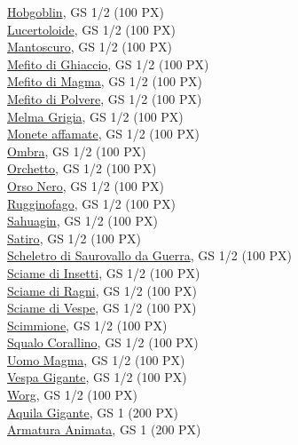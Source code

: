 \begin{multicols}{3}
{\hyperlink{Hobgoblin}{Hobgoblin}, GS 1/2 (100 PX)\\
\hyperlink{Lucertoloide}{Lucertoloide}, GS 1/2 (100 PX)\\
\hyperlink{Mantoscuro}{Mantoscuro}, GS 1/2 (100 PX)\\
\hyperlink{Mefito di Ghiaccio}{Mefito di Ghiaccio}, GS 1/2 (100 PX)\\
\hyperlink{Mefito di Magma}{Mefito di Magma}, GS 1/2 (100 PX)\\
\hyperlink{Mefito di Polvere}{Mefito di Polvere}, GS 1/2 (100 PX)\\
\hyperlink{Melma Grigia}{Melma Grigia}, GS 1/2 (100 PX)\\
\hyperlink{Monete affamate}{Monete affamate}, GS 1/2 (100 PX)\\
\hyperlink{Ombra}{Ombra}, GS 1/2 (100 PX)\\
\hyperlink{Orchetto}{Orchetto}, GS 1/2 (100 PX)\\
\hyperlink{Orso Nero}{Orso Nero}, GS 1/2 (100 PX)\\
\hyperlink{Rugginofago}{Rugginofago}, GS 1/2 (100 PX)\\
\hyperlink{Sahuagin}{Sahuagin}, GS 1/2 (100 PX)\\
\hyperlink{Satiro}{Satiro}, GS 1/2 (100 PX)\\
\hyperlink{Scheletro di Saurovallo da Guerra}{Scheletro di Saurovallo da Guerra}, GS 1/2 (100 PX)\\
\hyperlink{Sciame di Insetti}{Sciame di Insetti}, GS 1/2 (100 PX)\\
\hyperlink{Sciame di Ragni}{Sciame di Ragni}, GS 1/2 (100 PX)\\
\hyperlink{Sciame di Vespe}{Sciame di Vespe}, GS 1/2 (100 PX)\\
\hyperlink{Scimmione}{Scimmione}, GS 1/2 (100 PX)\\
\hyperlink{Squalo Corallino}{Squalo Corallino}, GS 1/2 (100 PX)\\
\hyperlink{Uomo Magma}{Uomo Magma}, GS 1/2 (100 PX)\\
\hyperlink{Vespa Gigante}{Vespa Gigante}, GS 1/2 (100 PX)\\
\hyperlink{Worg}{Worg}, GS 1/2 (100 PX)\\
\hyperlink{Aquila Gigante}{Aquila Gigante}, GS 1 (200 PX)\\
\hyperlink{Armatura Animata}{Armatura Animata}, GS 1 (200 PX)\\
}
\end{multicols}
